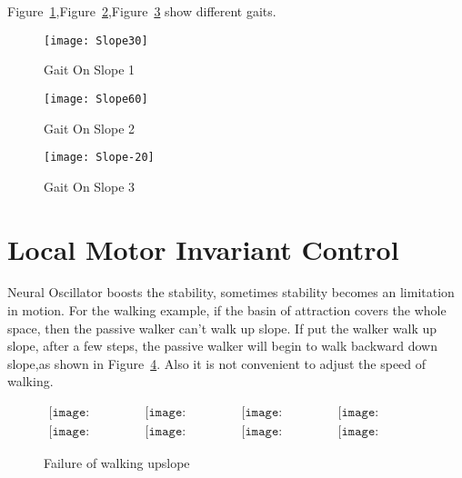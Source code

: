 Figure~\ref{fig:ss1},Figure~\ref{fig:ss2},Figure~\ref{fig:ss3} show different gaits.
\begin{figure}[!htbp]
  \begin{center}
      \texttt{[image: Slope30]}
    \caption{Gait On Slope 1} 
    \label{fig:ss1}
\end{center}
\end{figure}

\begin{figure}[!htbp]
  \begin{center}
      \texttt{[image: Slope60]}
    \caption{Gait On Slope 2}
    \label{fig:ss2}
\end{center}
\end{figure}

\begin{figure}[!htbp]
  \begin{center}
      \texttt{[image: Slope-20]}
    \caption{Gait On Slope 3}
    \label{fig:ss3}
\end{center}
\end{figure}






\section{Local Motor Invariant Control}
Neural Oscillator boosts the stability, sometimes stability becomes an limitation in motion.
For the walking example, if the basin of attraction covers the whole space, then the passive walker can't walk up slope.
If put the walker walk up slope, after a few steps, the passive walker will begin to walk backward down slope,as shown in Figure~\ref{fig:localcontrolwalking}.
Also it is not convenient to adjust the speed of walking.




\begin{figure}[!htbp]
  \begin{center}
         $\begin{array}{cccc}
\texttt{[image: UpFall/0001.eps]}&
\texttt{[image: UpFall/0051.eps]}&
\texttt{[image: UpFall/0101.eps]}&
\texttt{[image: UpFall/0151.eps]}
\\
\texttt{[image: UpFall/0201.eps]}&
\texttt{[image: UpFall/0251.eps]}&
\texttt{[image: UpFall/0301.eps]}&
\texttt{[image: UpFall/0351.eps]}
\end{array}$
    \caption{Failure of walking upslope}
    \label{fig:localcontrolwalking}
\end{center}
\end{figure}

